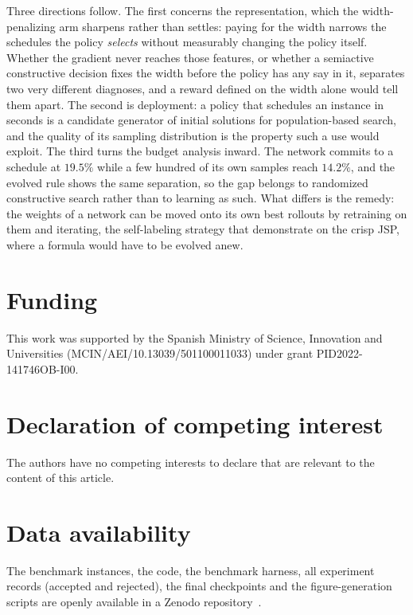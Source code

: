 \documentclass[preprint,authoryear,12pt]{elsarticle}
\theoremstyle{definition}
\theoremstyle{remark}
\begin{document}
Three directions follow. The first concerns the representation, which
the width-penalizing arm sharpens rather than settles: paying for the
width narrows the schedules the policy \emph{selects} without
measurably changing the policy itself. Whether the gradient never
reaches those features, or whether a semiactive constructive decision
fixes the width before the policy has any say in it, separates two
very different diagnoses, and a reward defined on the width alone
would tell them apart. The second is deployment: a policy that
schedules an instance in seconds is a candidate generator of initial
solutions for population-based search, and the quality of its
sampling distribution is the property such a use would exploit. The
third turns the budget analysis inward. The network commits to a
schedule at $19.5\%$ while a few hundred of its own samples reach
$14.2\%$, and the evolved rule shows the same separation, so the gap
belongs to randomized constructive search rather than to learning as
such. What
differs is the remedy: the weights of a network can be moved onto its
own best rollouts by retraining on them and iterating, the
self-labeling strategy that \citet{Corsini2024} demonstrate on the
crisp JSP, where a formula would have to be evolved anew.

\section*{Funding}
This work was supported by the Spanish Ministry of
Science, Innovation and Universities
(MCIN/AEI/10.13039/501100011033) under grant PID2022-141746OB-I00.

\section*{Declaration of competing interest}
The authors have no competing interests
to declare that are relevant to the content of this article.

\section*{Data availability}
The benchmark instances, the code,
the benchmark harness, all experiment records (accepted and
rejected), the final checkpoints and the figure-generation scripts
are openly available in a Zenodo
repository~\citep{DiazDRLDataset2026}.
\end{document}
